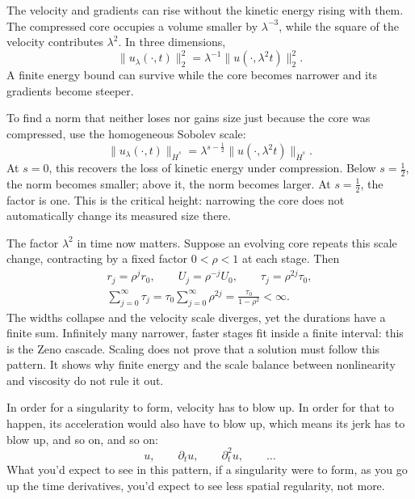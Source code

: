 The velocity and gradients can rise without the kinetic energy rising with
them. The compressed core occupies a volume smaller by \(\lambda^{-3}\), while
the square of the velocity contributes \(\lambda^2\). In three dimensions,
\[
\|u_\lambda(\cdot,t)\|_2^2
=\lambda^{-1}\|u(\cdot,\lambda^2t)\|_2^2.
\]
A finite energy bound can survive while the core becomes narrower and its
gradients become steeper.

To find a norm that neither loses nor gains size just because the core was
compressed, use the homogeneous Sobolev scale:
\[
\|u_\lambda(\cdot,t)\|_{\dot H^s}
=\lambda^{s-\frac12}\|u(\cdot,\lambda^2t)\|_{\dot H^s}.
\]
At \(s=0\), this recovers the loss of kinetic energy under compression. Below
\(s=\tfrac12\), the norm becomes smaller; above it, the norm becomes larger. At
\(s=\tfrac12\), the factor is one. This is the critical height: narrowing the
core does not automatically change its measured size there.

The factor \(\lambda^2\) in time now matters. Suppose an evolving core repeats
this scale change, contracting by a fixed factor
\(0<\rho<1\) at each stage. Then
\[
\begin{gathered}
r_j=\rho^jr_0,
\qquad U_j=\rho^{-j}U_0,
\qquad \tau_j=\rho^{2j}\tau_0,\\[3pt]
\displaystyle
\sum_{j=0}^{\infty}\tau_j
=\tau_0\sum_{j=0}^{\infty}\rho^{2j}
=\frac{\tau_0}{1-\rho^2}<\infty.
\end{gathered}
\]
The widths collapse and the velocity scale diverges, yet the durations have a
finite sum. Infinitely many narrower, faster stages fit inside a finite
interval: this is the Zeno cascade. Scaling does not prove that a solution must
follow this pattern. It shows why finite energy and the scale balance between
nonlinearity and viscosity do not rule it out.

\endgroup

In order for a singularity to form, velocity has to blow up. In order for
that to happen, its acceleration would also have to blow up, which means its
jerk has to blow up, and so on, and so on:
\[
u,\qquad \partial_tu,\qquad \partial_t^2u,\qquad \ldots
\]
What you'd expect to see in this pattern, if a singularity were to form, as
you go up the time derivatives, you'd expect to see less spatial regularity,
not more.

